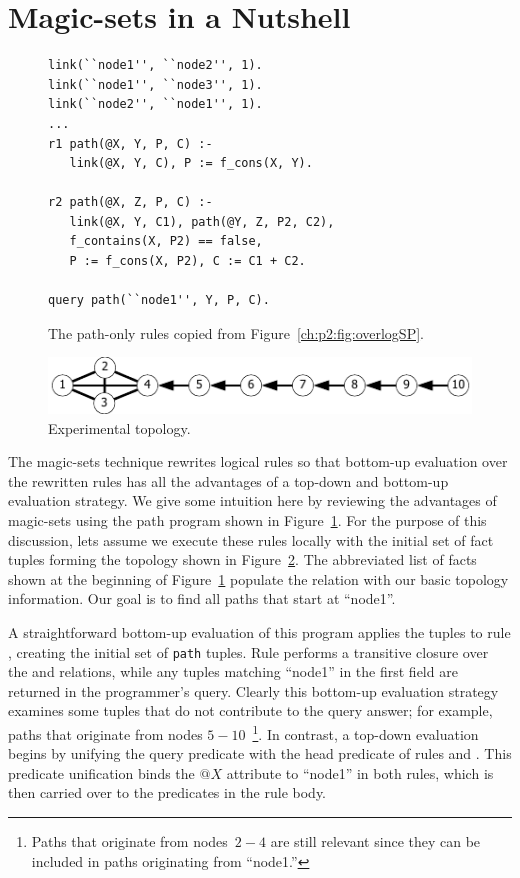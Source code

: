 \section{Magic-sets in a Nutshell}
\label{ch:magic:sec:review}

\begin{figure}[!t]
\ssp
\centering
\begin{lstlisting}
link(``node1'', ``node2'', 1).
link(``node1'', ``node3'', 1).
link(``node2'', ``node1'', 1).
...
r1 path(@X, Y, P, C) :-
   link(@X, Y, C), P := f_cons(X, Y).

r2 path(@X, Z, P, C) :-
   link(@X, Y, C1), path(@Y, Z, P2, C2),
   f_contains(X, P2) == false,
   P := f_cons(X, P2), C := C1 + C2.

query path(``node1'', Y, P, C).
\end{lstlisting}
\caption{\label{ch:magic:fig:basicSP}The path-only rules copied from Figure~\ref{ch:p2:fig:overlogSP}.}
\end{figure}

\begin{figure}
\centering
\includegraphics[scale=1.2]{figures/Topology}
\caption{Experimental topology.}
\label{ch:magic:fig:topo}
\end{figure}

The magic-sets technique rewrites logical rules so that bottom-up evaluation
over the rewritten rules has all the advantages of a top-down and bottom-up
evaluation strategy.  We give some intuition here by reviewing the advantages
of magic-sets using the path program shown in
Figure~\ref{ch:magic:fig:basicSP}.  For the purpose of this discussion, lets
assume we execute these rules locally with the initial set of  fact
tuples forming the topology shown in Figure~\ref{ch:magic:fig:topo}.  The
abbreviated list of facts shown at the beginning of
Figure~\ref{ch:magic:fig:basicSP} populate the  relation with our
basic topology information.  Our goal is to find all paths that start at
``node1''.

A straightforward bottom-up evaluation of this program applies the 
tuples to rule , creating the initial set of {\tt path} tuples.  Rule
 performs a transitive closure over the  and 
relations, while any  tuples matching ``node1'' in the first field are
returned in the programmer's query.  Clearly this bottom-up evaluation strategy
examines some  tuples that do not contribute to the query answer; for
example, paths that originate from nodes $5-10$~\footnote{Paths that originate
from nodes~$2-4$ are still relevant since they can be included in paths
originating from ``node1.''}.  In contrast, a top-down evaluation begins by
unifying the query predicate with the head predicate of rules  and
.  This  predicate unification binds the $@X$ attribute to
``node1'' in both rules, which is then carried over to the predicates in the
rule body.

